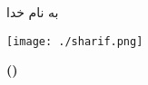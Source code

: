 \begin{titlingpage}
\center

به نام خدا
\vspace{5mm}

\texttt{[image: ./sharif.png]}\\[1cm]

\ifdefined\school
{\Large \school}
\fi
\vspace{4cm}

\ifdefined\course
{\Large \course}
\fi
\vspace{1cm}


{\Huge \textbf{ \thetitle \space \ifdefined\hwnumber \tartibinumeral{\hwnumber} \fi}}
\vspace{1cm}

\Large \textbf{\theauthor \ifdefined\studentnumber \space (\studentnumber) \fi}
\vspace{6cm}

\ifdefined\thedate
\thedate
\fi

\end{titlingpage}